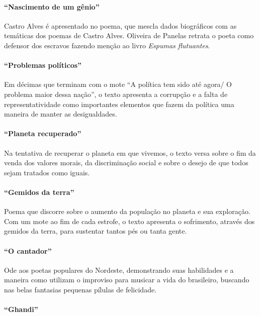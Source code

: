 \paragraph{``Nascimento de um gênio''}

Castro Alves é apresentado no poema, que mescla dados biográficos com
as temáticas dos poemas de Castro Alves. Oliveira de Panelas retrata o poeta como
defensor dos escravos fazendo menção ao livro \textit{Espumas flutuantes}.

\paragraph{``Problemas políticos''}

Em décimas que terminam com o mote ``A política tem
sido até agora/ O problema maior dessa nação'', o
texto apresenta a corrupção e a falta de representatividade como
importantes elementos que fazem da política uma maneira de manter as
desigualdades.

\paragraph{``Planeta recuperado''}

Na tentativa de recuperar o planeta em que vivemos, o texto versa sobre o
fim da venda dos valores morais, da discriminação social e sobre o
desejo de que todos sejam tratados como iguais.

\paragraph{``Gemidos da terra''}

Poema que discorre sobre o aumento da população no planeta e sua
exploração. Com um mote ao fim de cada estrofe, o texto
apresenta o sofrimento, através dos gemidos da terra, para sustentar
tantos pés ou tanta gente.

\paragraph{``O cantador''}

Ode aos poetas populares do Nordeste, demonstrando suas habilidades e a
maneira como utilizam o improviso para musicar a vida do
brasileiro, buscando nas belas fantasias pequenas pílulas de
felicidade.

\paragraph{``Ghandi''}

